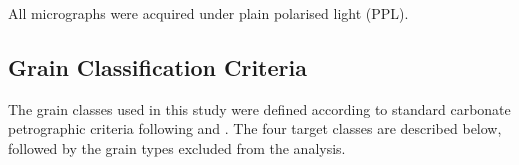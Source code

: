 \documentclass[a4paper,fleqn]{cas-dc}
\begin{document}
All micrographs were acquired under plain polarised light (PPL).

\subsection{Grain Classification Criteria}

The grain classes used in this study were defined according to standard carbonate petrographic criteria following \citet{bathurst1971} and \citet{flugel2010}. The four target classes are described below, followed by the grain types excluded from the analysis.
\end{document}
